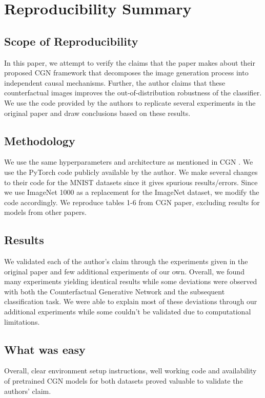 \section*{\centering Reproducibility Summary}

\subsection*{Scope of Reproducibility}

In this paper, we attempt to verify the claims that the paper \citep{sauer2021counterfactual} makes about their proposed CGN framework that decomposes the image generation process into independent causal mechanisms. Further, the author claims that these counterfactual images improves the out-of-distribution robustness of the classifier. We use the code provided by the authors to replicate several experiments in the original paper and draw conclusions based on these results.  

\subsection*{Methodology}
We use the same hyperparameters and architecture as mentioned in CGN \cite{sauer2021counterfactual}. We use the PyTorch code publicly available by the author. We make several changes to their code for the MNIST datasets since it gives spurious results/errors. Since we use ImageNet 1000 as a replacement for the ImageNet dataset, we modify the code accordingly. We reproduce tables 1-6 from CGN \cite{sauer2021counterfactual} paper, excluding results for models from other papers.

\subsection*{Results}
We validated each of the author's claim through the experiments given in the original paper and few additional experiments of our own. Overall, we found many experiments yielding identical results while some deviations were observed with both the Counterfactual Generative Network and the subsequent classification task. We were able to explain most of these deviations through our additional experiments while some couldn't be validated due to computational limitations.


\subsection*{What was easy}
Overall, clear environment setup instructions, well working code and availability of pretrained CGN models for both datasets proved valuable to validate the authors' claim. 

